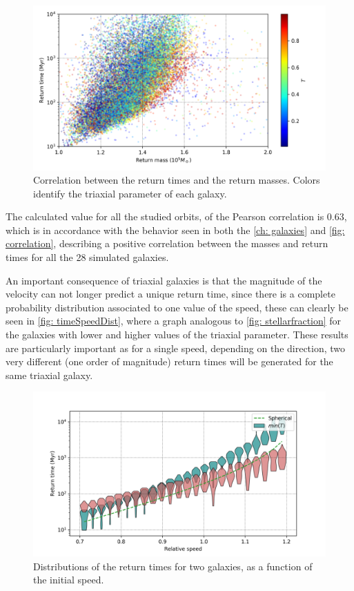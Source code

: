 	\begin{figure}[h]
		\centering
		\includegraphics[width = 0.8\linewidth]{"../Files/Week 13/correlation"}
		\caption{Correlation between the return times and the return masses. Colors identify the triaxial parameter of each galaxy.}
		\label{fig: correlation}
	\end{figure}
	
	The calculated value for all the studied orbits, of the Pearson correlation is 0.63, which is in accordance with the behavior seen in both the \autoref{ch: galaxies} and \autoref{fig: correlation}, describing a positive correlation between the masses and return times for all the 28 simulated galaxies.
	
	An important consequence of triaxial galaxies is that the magnitude of the velocity can not longer predict a unique return time, since there is a complete probability distribution associated to one value of the speed, these can clearly be seen in \autoref{fig: timeSpeedDist}, where a graph analogous to \autoref{fig: stellarfraction} for the galaxies with lower and higher values of the triaxial parameter. These results are particularly important as for a single speed, depending on the direction, two very different (one order of magnitude) return times will be generated for the same triaxial galaxy.
	
	\begin{figure}[h]
		\centering
		\includegraphics[width = 0.8\linewidth]{"../Files/Week 13/rt_speed"}
		\caption{Distributions of the return times for two galaxies, as a function of the initial speed.}
		\label{fig: timeSpeedDist}
	\end{figure}

